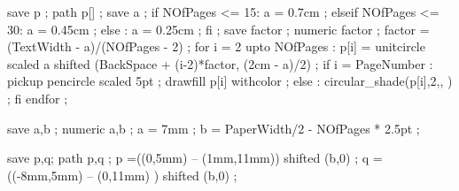 


\unprotect


% 
% 

\def\simpleslidescounter{simpleslides:shaded:counter4}

save p ; path p[] ;
save a ; 
if NOfPages <= 15:
	a = 0.7cm ;
elseif NOfPages <= 30:
	a = 0.45cm ;
else :
	a = 0.25cm ;
fi ;
save factor ; numeric factor ;
factor = (TextWidth - a)/(NOfPages - 2) ;
for i = 2 upto NOfPages :
	p[i] = unitcircle scaled a shifted (BackSpace + (i-2)*factor, (2cm - a)/2) ;
	if i = PageNumber :
		pickup pencircle scaled 5pt ;
		drawfill p[i] withcolor  ;
	else :
		circular_shade(p[i],2,, ) ;
	fi
endfor ;
\stopuseMPgraphic

save a,b ;
numeric a,b ;
a = 7mm ;
b = PaperWidth/2 - NOfPages * 2.5pt ;

save p,q; path p,q ;
p =((0,5mm)    -- (1mm,11mm)) shifted (b,0) ;
q =((-8mm,5mm) -- (0,11mm)  ) shifted (b,0) ;

